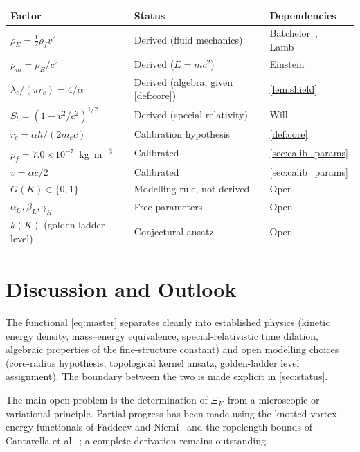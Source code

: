 \documentclass[11pt, a4paper]{article}
\newcommand{\vv}{v}          %
\newcommand{\rc}{r_c}        %
\newcommand{\rhof}{\rho_f}   %
\newcommand{\rhoE}{\rho_E}   %
\newcommand{\rhom}{\rho_m}   %
\newcommand{\lc}{\lambda_c}  %
\newcommand{\Stv}{S_t}       %
\begin{document}
\begin{center}
\begin{tabular}{lll}
\toprule
Factor & Status & Dependencies \\
\midrule
$\rhoE = \tfrac{1}{2}\rhof v^2$ & Derived (fluid mechanics) &
  Batchelor~\cite{Batchelor1967}, Lamb~\cite{Lamb1932} \\
$\rhom = \rhoE/c^2$ & Derived ($E=mc^2$) &
  Einstein~\cite{Einstein1905} \\
$\lc/(\pi\rc) = 4/\alpha$ & Derived (algebra, given \cref{def:core}) &
  \cref{lem:shield} \\
$\Stv = (1-v^2/c^2)^{1/2}$ & Derived (special relativity) &
  Will~\cite{Will2014} \\
$\rc = \alpha\hbar/(2m_e c)$ & Calibration hypothesis & \cref{def:core} \\
$\rhof = 7.0\times10^{-7}$~\si{kg.m^{-3}} & Calibrated &
  \cref{sec:calib_params} \\
$\vv = \alpha c/2$ & Calibrated & \cref{sec:calib_params} \\
$G(K) \in \{0,1\}$ & Modelling rule, not derived & Open \\
$\alpha_C,\beta_L,\gamma_H$ & Free parameters & Open \\
$k(K)$ (golden-ladder level) & Conjectural ansatz & Open \\
\bottomrule
\end{tabular}
\end{center}

\section{Discussion and Outlook}
\label{sec:discussion}

The functional \cref{eq:master} separates cleanly into
established physics (kinetic energy density, mass--energy
equivalence, special-relativistic time dilation, algebraic
properties of the fine-structure constant) and open modelling
choices (core-radius hypothesis, topological kernel ansatz,
golden-ladder level assignment).
The boundary between the two is made explicit in
\cref{sec:status}.

The main open problem is the determination of $\Xi_K$ from
a microscopic or variational principle.
Partial progress has been made using the knotted-vortex
energy functionals of Faddeev and Niemi~\cite{FaddeevNiemi1997}
and the ropelength bounds of Cantarella et al.~\cite{CantarellaKusner2002};
a complete derivation remains outstanding.
\end{document}
